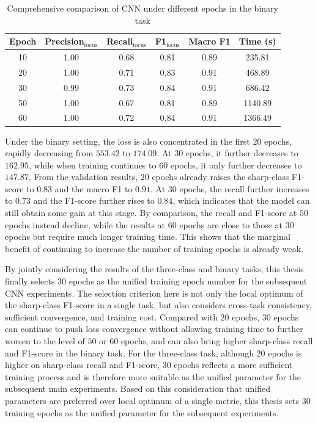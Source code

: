 \begin{table}[htbp]
    \centering
    \caption{Comprehensive comparison of CNN under different epochs in the binary task}
    \label{tab:epoch-binary-cnn}
    \begin{tabular}{cccccc}
        \toprule
        Epoch & Precision$_{\mathrm{focus}}$ & Recall$_{\mathrm{focus}}$ &
        F1$_{\mathrm{focus}}$ & Macro F1 & Time (s) \\
        \midrule
        10 & 1.00 & 0.68 & 0.81 & 0.89 & 235.81  \\
        20 & 1.00 & 0.71 & 0.83 & 0.91 & 468.89  \\
        30 & 0.99 & 0.73 & 0.84 & 0.91 & 686.42  \\
        50 & 1.00 & 0.67 & 0.81 & 0.89 & 1140.89 \\
        60 & 1.00 & 0.72 & 0.84 & 0.91 & 1366.49 \\
        \bottomrule
    \end{tabular}
\end{table}

\par Under the binary setting, the loss is also concentrated in the first $20$
epochs, rapidly decreasing from $553.42$ to $174.09$. At $30$ epochs, it
further decreases to $162.95$, while when training continues to $60$ epochs,
it only further decreases to $147.87$. From the validation results, $20$
epochs already raises the sharp-class F1-score to $0.83$ and the macro F1 to
$0.91$. At $30$ epochs, the recall further increases to $0.73$ and the
F1-score further rises to $0.84$, which indicates that the model can still
obtain some gain at this stage. By comparison, the recall and F1-score at $50$
epochs instead decline, while the results at $60$ epochs are close to those at
$30$ epochs but require much longer training time. This shows that the
marginal benefit of continuing to increase the number of training epochs is
already weak.

\par By jointly considering the results of the three-class and binary tasks,
this thesis finally selects $30$ epochs as the unified training epoch number
for the subsequent CNN experiments. The selection criterion here is not only
the local optimum of the sharp-class F1-score in a single task, but also
considers cross-task consistency, sufficient convergence, and training cost.
Compared with $20$ epochs, $30$ epochs can continue to push loss convergence
without allowing training time to further worsen to the level of $50$ or $60$
epochs, and can also bring higher sharp-class recall and F1-score in the
binary task. For the three-class task, although $20$ epochs is higher on
sharp-class recall and F1-score, $30$ epochs reflects a more sufficient
training process and is therefore more suitable as the unified parameter for
the subsequent main experiments. Based on this consideration that unified
parameters are preferred over local optimum of a single metric, this thesis
sets $30$ training epochs as the unified parameter for the subsequent
experiments.

